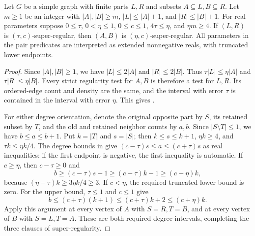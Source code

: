 \begin{lemma}
Let $G$ be a simple graph with finite parts $L,R$ and subsets
$A\subseteq L,B\subseteq R$. Let $m\geq1$ be an integer with
$|A|,|B|\geq m$, $|L|\leq|A|+1$, and $|R|\leq|B|+1$.
For real parameters suppose $0\leq\tau$, $0<\eta\leq1$,
$0\leq c\leq1$, $4\tau\leq\eta$, and $\eta m\geq4$.
If $(L,R)$ is $(\tau,c)$-super-regular, then $(A,B)$ is
$(\eta,c)$-super-regular. All parameters in the pair predicates
are interpreted as extended nonnegative reals, with truncated lower endpoints.
\end{lemma}
\begin{proof}
Since $|A|,|B|\geq1$, we have $|L|\leq2|A|$ and
$|R|\leq2|B|$. Thus $\tau|L|\leq\eta|A|$ and
$\tau|R|\leq\eta|B|$. Every strict regularity test for $A,B$
is therefore a test for $L,R$. Its ordered-edge count and density
are the same, and the interval with error $\tau$ is contained in
the interval with error $\eta$. This gives .

For either degree orientation, denote the original opposite part by
$S$, its retained subset by $T$, and the old and retained neighbor
counts by $a,b$. Since $|S\setminus T|\leq1$, we have
$b\leq a\leq b+1$. Put $k=|T|$ and $s=|S|$; then
$k\leq s\leq k+1$, $\eta k\geq4$, and $\tau k\leq\eta k/4$.
The degree bounds in  give
$(c-\tau)s\leq a\leq(c+\tau)s$ as real inequalities:
if the first endpoint is negative, the first inequality is automatic.
If $c\geq\eta$, then $c-\tau\geq0$ and
\[
 b\geq(c-\tau)s-1\geq(c-\tau)k-1\geq(c-\eta)k,
\]
because $(\eta-\tau)k\geq3\eta k/4\geq3$.
If $c<\eta$, the required truncated lower bound is zero.
For the upper bound, $\tau\leq1$ and $c\leq1$ give
\[
 b\leq(c+\tau)(k+1)\leq(c+\tau)k+2\leq(c+\eta)k.
\]
Apply this argument at every vertex of $A$ with $S=R,T=B$, and
at every vertex of $B$ with $S=L,T=A$. These are both required
degree intervals, completing the three clauses of super-regularity.
\end{proof}
